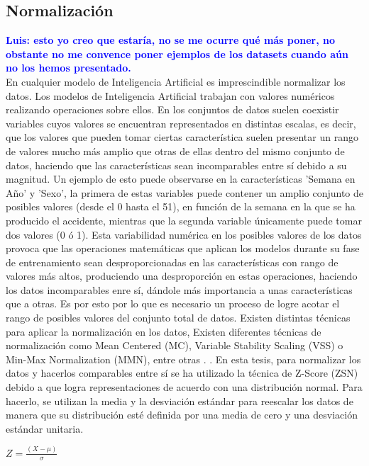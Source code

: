 \documentclass{uathesis-es}
\begin{document}
\subsection{Normalización}

\textcolor{blue}{\textbf{Luis: esto yo creo que estaría, no se me ocurre qué más poner, no obstante no me convence poner ejemplos de los datasets cuando aún no los hemos presentado.}}\\

En cualquier modelo de Inteligencia Artificial es imprescindible normalizar los datos. Los modelos de Inteligencia Artificial trabajan con valores numéricos realizando operaciones sobre ellos. En los conjuntos de datos suelen coexistir variables cuyos valores se encuentran representados en distintas escalas, es decir, que los valores que pueden tomar ciertas característica suelen presentar un rango de valores mucho más amplio que otras de ellas dentro del mismo conjunto de datos, haciendo que las características sean incomparables entre sí debido a su magnitud. Un ejemplo de esto puede observarse en la características 'Semana en Año' y 'Sexo', la primera de estas variables puede contener un amplio conjunto de posibles valores (desde el 0 hasta el 51), en función de la semana en la que se ha producido el accidente, mientras que la segunda variable únicamente puede tomar dos valores (0 ó 1). Esta variabilidad numérica en los posibles valores de los datos provoca que las operaciones matemáticas que aplican los modelos durante su fase de entrenamiento sean desproporcionadas en las características con rango de valores más altos, produciendo una desproporción en estas operaciones, haciendo los datos incomparables enre sí, dándole más importancia a unas características que a otras. Es por esto por lo que es necesario un proceso de logre acotar el rango de posibles valores del conjunto total de datos. Existen distintas técnicas para aplicar la normalización en los datos, Existen diferentes técnicas de normalización como Mean Centered (MC), Variable Stability Scaling (VSS) o Min-Max Normalization (MMN), entre otras \cite{DataNormalizationInvestigation}. . En esta tesis, para normalizar los datos y hacerlos comparables entre sí se ha utilizado la técnica de Z-Score (ZSN) debido a que logra representaciones de acuerdo con una distribución normal. Para hacerlo, se utilizan la media y la desviación estándar para reescalar los datos de manera que su distribución esté definida por una media de cero y una desviación estándar unitaria.


\begin{center}
    $Z = \frac{(X - \mu)}{\sigma}$
\end{center}
\end{document}
